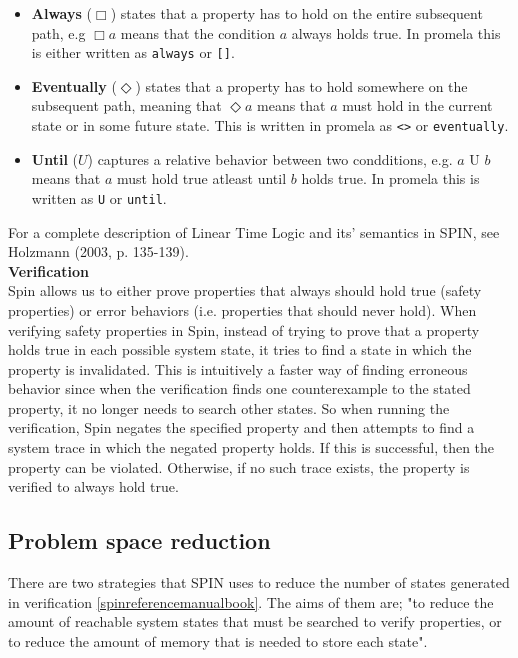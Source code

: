 \begin{itemize}
	\setlength\itemsep{1em}
	\item[] \textbf{Always} ($\Box$) states that a property has to hold on the entire subsequent path, e.g $\Box a$ means that the condition $a$ always holds true. In promela this is either written as \texttt{always} or \texttt{[]}.
	\item[] \textbf{Eventually} ($\Diamond$) states that a property has to hold somewhere on the subsequent path, meaning that $\Diamond a$ means that $a$ must hold in the current state or in some future state. This is written in promela as \texttt{<>} or \texttt{eventually}.
	\item[] \textbf{Until} ($U$) captures a relative behavior between two condditions, e.g. $a \text{ U } b$ means that $a$ must hold true atleast until $b$ holds true. In promela this is written as \texttt{U} or \texttt{until}.
 \end{itemize}

For a complete description of Linear Time Logic and its' semantics in SPIN, see Holzmann (2003, p. 135-139). \\

\textbf{Verification} \\

Spin allows us to either prove properties that always should hold true (safety properties) or error behaviors (i.e. properties that should never hold). When verifying safety properties in Spin, instead of trying to prove that a property holds true in each possible system state, it tries to find a state in which the property is invalidated. This is intuitively a faster way of finding erroneous behavior since when the verification finds one counterexample to the stated property, it no longer needs to search other states. 
So when running the verification, Spin negates the specified property and then attempts to find a system trace in which the negated property holds. If this is successful, then the property can be violated. Otherwise, if no such trace exists, the property is verified to always hold true.

\subsection{Problem space reduction}


There are two strategies that SPIN uses to reduce the number of states generated in verification \ref{spinreferencemanualbook}. The aims of them are; "to reduce the amount of reachable system states that must be searched to verify properties, or to reduce the amount of memory that is needed to store each state".

